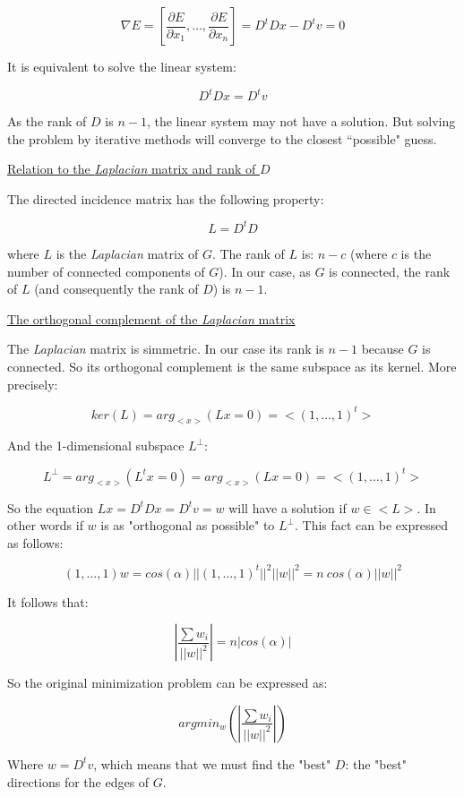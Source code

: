\documentclass[a4paper,11pt]{article}
\begin{document}
$$\nabla E = [\frac{\partial E}{\partial x_1}, \dots, \frac{\partial 
E}{\partial x_n}] = D^tDx-D^tv=0$$

It is equivalent to solve the linear system:

$$D^tDx = D^tv$$

As the rank of $D$ is $n-1$, the linear system may not have a solution. 
But solving the problem by iterative methods will converge to the 
closest ``possible" guess.

\bigskip

\underline{Relation to the \textit{Laplacian} matrix and rank of $D$}

\bigskip

The directed incidence matrix has the following property:

$$L = D^t D$$

where $L$ is the \textit{Laplacian} matrix of $G$. The rank of 
$L$ is: $n-c$ (where $c$ is the number of connected components of $G$). 
In our case, as $G$ is connected, the rank of $L$ (and consequently the 
rank of $D$) is $n-1$.

\bigskip

\underline{The orthogonal complement of the \textit{Laplacian} matrix}

\bigskip

The \textit{Laplacian} matrix is simmetric. In our case its rank is $n-1$ 
because $G$ is connected. So its orthogonal complement is the same 
subspace as its kernel. More precisely:

$$ker(L) = arg_{<x>} (L x = 0) = <(1,\dots,1)^t>$$

And the 1-dimensional subspace $L^{\bot}$:

$$L^{\bot} = arg_{<x>} (L^t x = 0) = arg_{<x>} (L x = 0) = <(1,\dots,1)^t>$$

So the equation $L x = D^t D x = D^t v = w$ will have a solution if $w 
\in <L>$. In other words if $w$ is as "orthogonal as possible" to 
$L^{\bot}$. This fact can be expressed as follows:

$$(1,\dots,1) w = cos(\alpha) ||(1,\dots,1)^t||^2 ||w||^2 = n \ cos(\alpha) 
||w||^2$$

It follows that:

$$|\frac{\sum w_i}{||w||^2}| = n |cos(\alpha)|$$

So the original minimization problem can be expressed as:

$$argmin_w(|\frac{\sum w_i}{||w||^2}|)$$

Where $w = D^t v$, which means that we must find the "best" $D$: the 
"best" directions for the edges of $G$.
\end{document}
